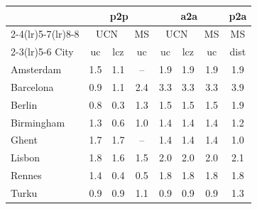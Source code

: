 \begin{table}[t]
\centering
\small
\begin{tabular}{lccc ccc c}
\toprule
& \multicolumn{3}{c}{p2p} & \multicolumn{3}{c}{a2a} & p2a \\
\cmidrule(lr){2-4}\cmidrule(lr){5-7}\cmidrule(lr){8-8}
& \multicolumn{2}{c}{UCN} & MS & \multicolumn{2}{c}{UCN} & MS & MS \\
\cmidrule(lr){2-3}\cmidrule(lr){5-6}
City & uc & lcz & uc & uc & lcz & uc & dist \\
\midrule
Amsterdam & \cellcolor[RGB]{253,142,60}1.5 & \cellcolor[RGB]{254,184,83}1.1 & \cellcolor[RGB]{255,255,204}-- & \cellcolor[RGB]{252,80,42}1.9 & \cellcolor[RGB]{252,80,42}1.9 & \cellcolor[RGB]{252,80,42}1.9 & \cellcolor[RGB]{249,72,40}1.9 \\
Barcelona & \cellcolor[RGB]{254,200,100}0.9 & \cellcolor[RGB]{254,178,76}1.1 & \cellcolor[RGB]{211,15,32}2.4 & \cellcolor[RGB]{128,0,38}3.3 & \cellcolor[RGB]{128,0,38}3.3 & \cellcolor[RGB]{128,0,38}3.3 & \cellcolor[RGB]{128,0,38}3.9 \\
Berlin & \cellcolor[RGB]{254,209,109}0.8 & \cellcolor[RGB]{255,238,163}0.3 & \cellcolor[RGB]{253,155,66}1.3 & \cellcolor[RGB]{252,140,59}1.5 & \cellcolor[RGB]{252,140,59}1.5 & \cellcolor[RGB]{252,140,59}1.5 & \cellcolor[RGB]{252,78,42}1.9 \\
Birmingham & \cellcolor[RGB]{253,163,69}1.3 & \cellcolor[RGB]{254,223,130}0.6 & \cellcolor[RGB]{254,192,91}1.0 & \cellcolor[RGB]{253,148,63}1.4 & \cellcolor[RGB]{253,148,63}1.4 & \cellcolor[RGB]{253,148,63}1.4 & \cellcolor[RGB]{253,165,70}1.2 \\
Ghent & \cellcolor[RGB]{252,110,51}1.7 & \cellcolor[RGB]{252,110,51}1.7 & \cellcolor[RGB]{255,255,204}-- & \cellcolor[RGB]{253,148,63}1.4 & \cellcolor[RGB]{253,148,63}1.4 & \cellcolor[RGB]{253,148,63}1.4 & \cellcolor[RGB]{254,188,87}1.0 \\
Lisbon & \cellcolor[RGB]{252,86,44}1.8 & \cellcolor[RGB]{252,124,55}1.6 & \cellcolor[RGB]{252,132,57}1.5 & \cellcolor[RGB]{246,65,38}2.0 & \cellcolor[RGB]{246,65,38}2.0 & \cellcolor[RGB]{246,65,38}2.0 & \cellcolor[RGB]{239,52,35}2.1 \\
Rennes & \cellcolor[RGB]{253,149,63}1.4 & \cellcolor[RGB]{255,237,161}0.4 & \cellcolor[RGB]{254,229,144}0.5 & \cellcolor[RGB]{252,90,45}1.8 & \cellcolor[RGB]{252,90,45}1.8 & \cellcolor[RGB]{252,90,45}1.8 & \cellcolor[RGB]{252,96,47}1.8 \\
Turku & \cellcolor[RGB]{254,205,105}0.9 & \cellcolor[RGB]{254,205,105}0.9 & \cellcolor[RGB]{254,182,80}1.1 & \cellcolor[RGB]{255,255,204}0.9 & \cellcolor[RGB]{255,255,204}0.9 & \cellcolor[RGB]{255,255,204}0.9 & \cellcolor[RGB]{253,161,68}1.3 \\

\end{tabular}
\end{table}
